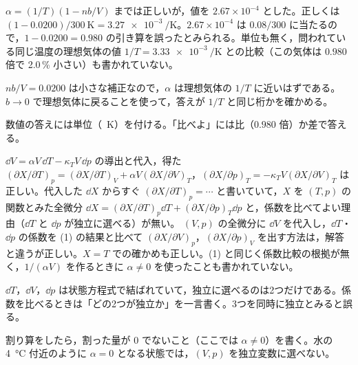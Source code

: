 \begin{kotaeran}
   $\alpha=(1/T)(1-nb/V)$ までは正しいが，値を $2.67\times10^{-4}$ とした。正しくは $(1-0.0200)/\qty{300}{\kelvin}=\qty{3.27e-3}{\per\kelvin}$。$2.67\times10^{-4}$ は $0.08/300$ に当たるので，$1-0.0200=0.980$ の引き算を誤ったとみられる。単位も無く，問われている同じ温度の理想気体の値 $1/T=\qty{3.33e-3}{\per\kelvin}$ との比較（この気体は $0.980$ 倍で 2.0\,\% 小さい）も書かれていない。
\end{kotaeran}
\begin{rikai}
  \item $nb/V=0.0200$ は小さな補正なので，$\alpha$ は理想気体の $1/T$ に近いはずである。$b\to0$ で理想気体に戻ることを使って，答えが $1/T$ と同じ桁かを確かめる。
  \item 数値の答えには単位（\unit{\per\kelvin}）を付ける。「比べよ」には比（$0.980$ 倍）か差で答える。
\end{rikai}
\begin{kotaeran}
   $\dd V=\alpha V\,\dd T-\kappa_{T}V\,\dd p$ の導出と代入，得た $(\partial X/\partial T)_{p}=(\partial X/\partial T)_{V}+\alpha V(\partial X/\partial V)_{T}$，$(\partial X/\partial p)_{T}=-\kappa_{T}V(\partial X/\partial V)_{T}$ は正しい。代入した $\dd X$ からすぐ $(\partial X/\partial T)_{p}=\cdots$ と書いていて，$X$ を $(T,p)$ の関数とみた全微分 $\dd X=(\partial X/\partial T)_{p}\dd T+(\partial X/\partial p)_{T}\dd p$ と，係数を比べてよい理由（$\dd T$ と $\dd p$ が独立に選べる）が無い。
   $(V,p)$ の全微分に $\dd V$ を代入し，$\dd T$・$\dd p$ の係数を (1) の結果と比べて $(\partial X/\partial V)_{p}$，$(\partial X/\partial p)_{V}$ を出す方法は，解答と違うが正しい。$X=T$ での確かめも正しい。(1) と同じく係数比較の根拠が無く，$1/(\alpha V)$ を作るときに $\alpha\neq0$ を使ったことも書かれていない。
\end{kotaeran}
\begin{rikai}
  \item $\dd T$，$\dd V$，$\dd p$ は状態方程式で結ばれていて，独立に選べるのは2つだけである。係数を比べるときは「どの2つが独立か」を一言書く。3つを同時に独立とみると誤る。
  \item 割り算をしたら，割った量が 0 でないこと（ここでは $\alpha\neq0$）を書く。水の \qty{4}{\degreeCelsius} 付近のように $\alpha=0$ となる状態では，$(V,p)$ を独立変数に選べない。
\end{rikai}
